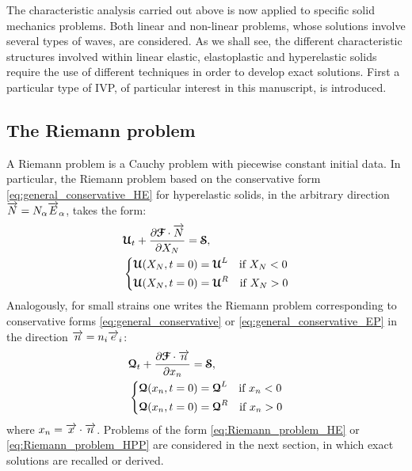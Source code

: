 The characteristic analysis carried out above is now applied to specific solid mechanics problems.
Both linear and non-linear problems, whose solutions involve several types of waves, are considered.
As we shall see, the different characteristic structures involved within linear elastic, elastoplastic and hyperelastic solids require the use of different techniques in order to develop exact solutions. First a particular type of IVP, of particular interest in this manuscript, is introduced.
\subsection{The Riemann problem}
A Riemann problem is a Cauchy problem with piecewise constant initial data. In particular, the Riemann problem based on the conservative form \eqref{eq:general_conservative_HE} for hyperelastic solids, in the arbitrary direction ${\overrightarrow{N}}=N_\alpha {\overrightarrow{E}}_\alpha$, takes the form:
\begin{equation}
  \label{eq:Riemann_problem_HE}
  \begin{aligned}
    &{\boldsymbol{\mathcal{U}}}_t + \frac{\partial {\boldsymbol{\mathcal{F}}}\cdot {\overrightarrow{N}}}{\partial X_N} = {\boldsymbol{\mathcal{S}}}, \\
    &\left\lbrace 
      \begin{aligned}
        & {\boldsymbol{\mathcal{U}}}(X_N,t=0) = {\boldsymbol{\mathcal{U}}}^L \quad \text{if } X_N< 0\\
        & {\boldsymbol{\mathcal{U}}}(X_N,t=0) = {\boldsymbol{\mathcal{U}}}^R \quad \text{if } X_N> 0
      \end{aligned}
    \right.
  \end{aligned}
\end{equation}
Analogously, for small strains one writes the Riemann problem corresponding to conservative forms \eqref{eq:general_conservative} or \eqref{eq:general_conservative_EP} in the direction ${\overrightarrow{n}}=n_i {\overrightarrow{e}}_i$:
\begin{equation}
  \label{eq:Riemann_problem_HPP}
  \begin{aligned}
    &{\boldsymbol{\mathcal{Q}}}_t + \frac{\partial {\boldsymbol{\mathcal{F}}}\cdot {\overrightarrow{n}}}{\partial x_n} = {\boldsymbol{\mathcal{S}}}, \\
    &\left\lbrace 
      \begin{aligned}
        & {\boldsymbol{\mathcal{Q}}}(x_n,t=0) = {\boldsymbol{\mathcal{Q}}}^L \quad \text{if } x_n< 0\\
        & {\boldsymbol{\mathcal{Q}}}(x_n,t=0) = {\boldsymbol{\mathcal{Q}}}^R \quad \text{if } x_n> 0
      \end{aligned}
    \right.
  \end{aligned}
\end{equation}
where $x_n={\overrightarrow{x}}\cdot{\overrightarrow{n}}$.
Problems of the form \eqref{eq:Riemann_problem_HE} or \eqref{eq:Riemann_problem_HPP} are considered in the next section, in which exact solutions are recalled or derived.

